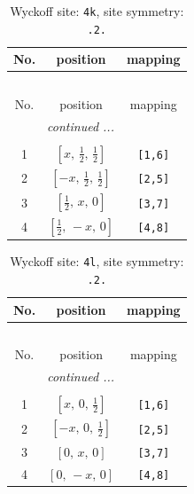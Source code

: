 \documentclass[fleqn,8pt]{jsarticle}
\begin{document}
\renewcommand{\arraystretch}{1.2}
\begin{longtable}{ccc}
\caption{Wyckoff site: {\tt 4k}, site symmetry: {\tt .2.}}
 \\
 \hline \hline
No. & position & mapping \\ \hline \endfirsthead

\multicolumn{2}{l}{\tablename\ \thetable{}} \\
 \hline \hline
No. & position & mapping \\ \hline \endhead

 \hline \hline
\multicolumn{2}{r}{\footnotesize\it continued ...} \\ \endfoot

 \hline \hline
\multicolumn{2}{r}{} \\ \endlastfoot

1 & $\left[ x,\, \frac{1}{2},\, \frac{1}{2} \right]$ & {\tt [1,6]} \\ \hline
2 & $\left[ - x,\, \frac{1}{2},\, \frac{1}{2} \right]$ & {\tt [2,5]} \\ \hline
3 & $\left[ \frac{1}{2},\, x,\, 0 \right]$ & {\tt [3,7]} \\ \hline
4 & $\left[ \frac{1}{2},\, - x,\, 0 \right]$ & {\tt [4,8]} \\
\end{longtable}
\renewcommand{\arraystretch}{1.2}
\begin{longtable}{ccc}
\caption{Wyckoff site: {\tt 4l}, site symmetry: {\tt .2.}}
 \\
 \hline \hline
No. & position & mapping \\ \hline \endfirsthead

\multicolumn{2}{l}{\tablename\ \thetable{}} \\
 \hline \hline
No. & position & mapping \\ \hline \endhead

 \hline \hline
\multicolumn{2}{r}{\footnotesize\it continued ...} \\ \endfoot

 \hline \hline
\multicolumn{2}{r}{} \\ \endlastfoot

1 & $\left[ x,\, 0,\, \frac{1}{2} \right]$ & {\tt [1,6]} \\ \hline
2 & $\left[ - x,\, 0,\, \frac{1}{2} \right]$ & {\tt [2,5]} \\ \hline
3 & $\left[ 0,\, x,\, 0 \right]$ & {\tt [3,7]} \\ \hline
4 & $\left[ 0,\, - x,\, 0 \right]$ & {\tt [4,8]} \\
\end{longtable}
\end{document}
